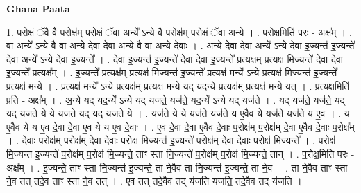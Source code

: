 \documentclass[17pt]{extarticle}
\begin{document}
\textbf{Ghana Paata } \newline

1. प॒रोक्षं॒ ॅवै वै प॒रोक्ष॑म् प॒रोक्षं॒ ॅवा अ॒न्ये᳚ ऽन्ये वै प॒रोक्ष॑म् प॒रोक्षं॒ ॅवा अ॒न्ये । . प॒रोक्ष॒मिति॑ परः - अक्ष᳚म् । . वा अ॒न्ये᳚ ऽन्ये वै वा अ॒न्ये दे॒वा दे॒वा अ॒न्ये वै वा अ॒न्ये दे॒वाः । . अ॒न्ये दे॒वा दे॒वा अ॒न्ये᳚ ऽन्ये दे॒वा इ॒ज्यन्त॑ इ॒ज्यन्ते॑ दे॒वा अ॒न्ये᳚ ऽन्ये दे॒वा इ॒ज्यन्ते᳚ । . दे॒वा इ॒ज्यन्त॑ इ॒ज्यन्ते॑ दे॒वा दे॒वा इ॒ज्यन्ते᳚ प्र॒त्यक्ष॑म् प्र॒त्यक्ष॑ मि॒ज्यन्ते॑ दे॒वा दे॒वा इ॒ज्यन्ते᳚ प्र॒त्यक्ष᳚म् । . इ॒ज्यन्ते᳚ प्र॒त्यक्ष॑म् प्र॒त्यक्ष॑ मि॒ज्यन्त॑ इ॒ज्यन्ते᳚ प्र॒त्यक्ष॑ म॒न्ये᳚ ऽन्ये प्र॒त्यक्ष॑ मि॒ज्यन्त॑ इ॒ज्यन्ते᳚ प्र॒त्यक्ष॑ म॒न्ये । . प्र॒त्यक्ष॑ म॒न्ये᳚ ऽन्ये प्र॒त्यक्ष॑म् प्र॒त्यक्ष॑ म॒न्ये यद् यद॒न्ये प्र॒त्यक्ष॑म् प्र॒त्यक्ष॑ म॒न्ये यत् । . प्र॒त्यक्ष॒मिति॑ प्रति - अक्ष᳚म् । . अ॒न्ये यद् यद॒न्ये᳚ ऽन्ये यद् यज॑ते॒ यज॑ते॒ यद॒न्ये᳚ ऽन्ये यद् यज॑ते । . यद् यज॑ते॒ यज॑ते॒ यद् यद् यज॑ते॒ ये ये यज॑ते॒ यद् यद् यज॑ते॒ ये । . यज॑ते॒ ये ये यज॑ते॒ यज॑ते॒ य ए॒वैव ये यज॑ते॒ यज॑ते॒ य ए॒व । . य ए॒वैव ये य ए॒व दे॒वा दे॒वा ए॒व ये य ए॒व दे॒वाः । . ए॒व दे॒वा दे॒वा ए॒वैव दे॒वाः प॒रोक्ष॑म् प॒रोक्ष॑म् दे॒वा ए॒वैव दे॒वाः प॒रोक्ष᳚म् । . दे॒वाः प॒रोक्ष॑म् प॒रोक्ष॑म् दे॒वा दे॒वाः प॒रोक्ष॑ मि॒ज्यन्त॑ इ॒ज्यन्ते॑ प॒रोक्ष॑म् दे॒वा दे॒वाः प॒रोक्ष॑ मि॒ज्यन्ते᳚ । . प॒रोक्ष॑ मि॒ज्यन्त॑ इ॒ज्यन्ते॑ प॒रोक्ष॑म् प॒रोक्ष॑ मि॒ज्यन्ते॒ ताꣳ स्ता नि॒ज्यन्ते॑ प॒रोक्ष॑म् प॒रोक्ष॑ मि॒ज्यन्ते॒ तान् । . प॒रोक्ष॒मिति॑ परः - अक्ष᳚म् । . इ॒ज्यन्ते॒ ताꣳ स्ता नि॒ज्यन्त॑ इ॒ज्यन्ते॒ ता ने॒वैव ता नि॒ज्यन्त॑ इ॒ज्यन्ते॒ ता ने॒व । . ता ने॒वैव ताꣳ स्ता ने॒व तत् तदे॒व ताꣳ स्ता ने॒व तत् । . ए॒व तत् तदे॒वैव तद् य॑जति यजति॒ तदे॒वैव तद् य॑जति । \newline
\end{document}
